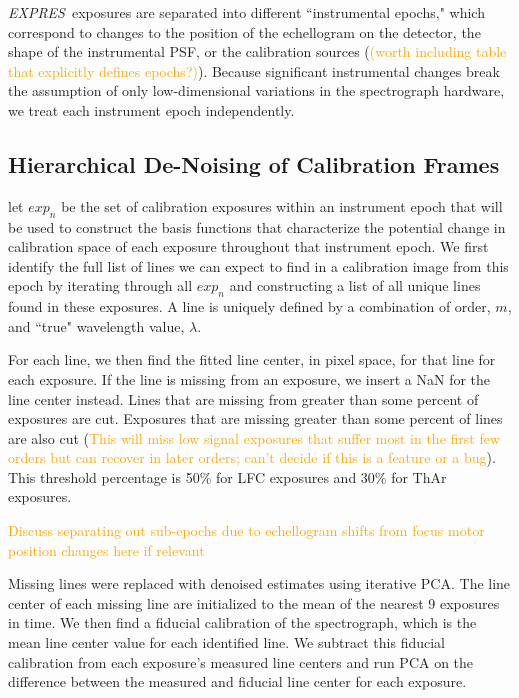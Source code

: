 \documentclass[12pt, letterpaper]{article}
\newcommand{\lz}[1]{\textcolor{orange}{#1}}
\newcommand{\project}[1]{\textsl{#1}}
\newcommand{\acronym}[1]{{\small{#1}}}
\newcommand{\expres}{\project{\acronym{EXPRES}}}
\begin{document}
\expres\ exposures are separated into different ``instrumental epochs," which correspond to changes to the position of the echellogram on the detector, the shape of the instrumental PSF, or the calibration sources (\lz{(worth including table that explicitly defines epochs?)}).  Because significant instrumental changes break the assumption of only low-dimensional variations in the spectrograph hardware, we treat each instrument epoch independently.

\subsection{Hierarchical De-Noising of Calibration Frames} \label{sec:denoising}
let ${exp_n}$ be the set of calibration exposures within an instrument epoch that will be used to construct the basis functions that characterize the potential change in calibration space of each exposure throughout that instrument epoch.  We first identify the full list of lines we can expect to find in a calibration image from this epoch by iterating through all ${exp_n}$ and constructing a list of all unique lines found in these exposures.  A line is uniquely defined by a combination of order, $m$, and ``true" wavelength value, $\lambda$.

For each line, we then find the fitted line center, in pixel space, for that line for each exposure.  If the line is missing from an exposure, we insert a NaN for the line center instead.  Lines that are missing from greater than some percent of exposures are cut.  Exposures that are missing greater than some percent of lines are also cut (\lz{This will miss low signal exposures that suffer most in the first few orders but can recover in later orders; can't decide if this is a feature or a bug}).  This threshold percentage is 50\% for LFC exposures and 30\% for ThAr exposures.

\lz{Discuss separating out sub-epochs due to echellogram shifts from focus motor position changes here if relevant}

Missing lines were replaced with denoised estimates using iterative PCA.  The line center of each missing line are initialized to the mean of the nearest 9 exposures in time.  We then find a fiducial calibration of the spectrograph, which is the mean line center value for each identified line.  We subtract this fiducial calibration from each exposure's measured line centers and run PCA on the difference between the measured and fiducial line center for each exposure.
\end{document}
